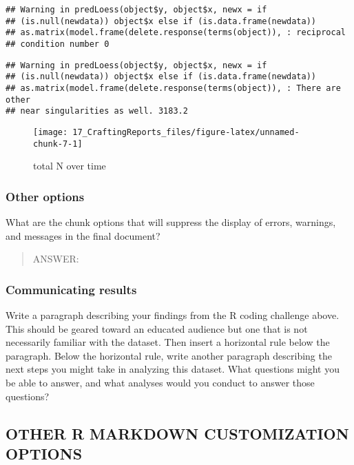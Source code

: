 \documentclass[]{article}
\begin{document}
\begin{verbatim}
## Warning in predLoess(object$y, object$x, newx = if
## (is.null(newdata)) object$x else if (is.data.frame(newdata))
## as.matrix(model.frame(delete.response(terms(object)), : reciprocal
## condition number 0
\end{verbatim}

\begin{verbatim}
## Warning in predLoess(object$y, object$x, newx = if
## (is.null(newdata)) object$x else if (is.data.frame(newdata))
## as.matrix(model.frame(delete.response(terms(object)), : There are other
## near singularities as well. 3183.2
\end{verbatim}

\begin{figure}

\texttt{[image: 17\_CraftingReports\_files/figure-latex/unnamed-chunk-7-1]} \hfill{}

\caption{total N over time}\label{fig:unnamed-chunk-7}
\end{figure}

\subsubsection{Other options}\label{other-options}

What are the chunk options that will suppress the display of errors,
warnings, and messages in the final document?

\begin{quote}
ANSWER:
\end{quote}

\subsubsection{Communicating results}\label{communicating-results}

Write a paragraph describing your findings from the R coding challenge
above. This should be geared toward an educated audience but one that is
not necessarily familiar with the dataset. Then insert a horizontal rule
below the paragraph. Below the horizontal rule, write another paragraph
describing the next steps you might take in analyzing this dataset. What
questions might you be able to answer, and what analyses would you
conduct to answer those questions?

\subsection{OTHER R MARKDOWN CUSTOMIZATION
OPTIONS}\label{other-r-markdown-customization-options}
\end{document}
